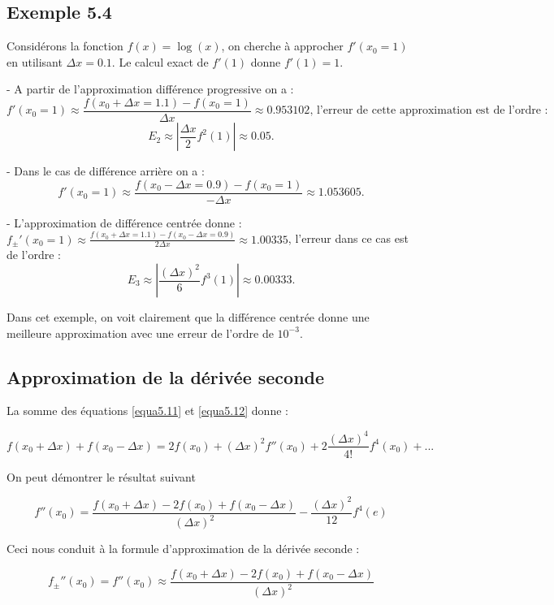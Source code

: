 \subsection{Exemple 5.4}
Considérons la fonction \( f(x) = \log(x) \), on cherche à approcher \( f'(x_0 = 1) \) en utilisant \( \Delta x = 0.1 \). Le calcul exact de \( f'(1) \) donne \( f'(1) = 1 \).

- A partir de l'approximation différence progressive on a :
\[
f'(x_0 = 1) \approx \frac{f(x_0 + \Delta x = 1.1) - f(x_0 = 1)}{\Delta x} \approx 0.953102, \, \text{l'erreur de cette approximation est de l'ordre : }
\]
\[
E_2 \approx \left| \frac{\Delta x}{2} f^2(1) \right| \approx 0.05.
\]

- Dans le cas de différence arrière on a :
\[
f'(x_0 = 1) \approx \frac{f(x_0 - \Delta x = 0.9) - f(x_0 = 1)}{-\Delta x} \approx 1.053605.
\]

- L'approximation de différence centrée donne : \( f_{\pm}'(x_0 = 1) \approx \frac{f(x_0 + \Delta x = 1.1) - f(x_0 - \Delta x = 0.9)}{2\Delta x} \approx 1.00335 \),  
l'erreur dans ce cas est de l'ordre :  
\[
E_3 \approx \left| \frac{(\Delta x)^2}{6} f^3(1) \right| \approx 0.00333.
\]

Dans cet exemple, on voit clairement que la différence centrée donne une meilleure approximation avec une erreur de l'ordre de \( 10^{-3} \).

\subsection{Approximation de la dérivée seconde}
La somme des équations \eqref{equa5.11} et \eqref{equa5.12} donne :

\begin{equation}\label{equa5.16}
f(x_0 + \Delta x) + f(x_0 - \Delta x) = 2f(x_0) + (\Delta x)^2 f''(x_0) + 2\frac{(\Delta x)^4}{4!} f^4(x_0) + ... 
\end{equation}

On peut démontrer le résultat suivant

\begin{equation}\label{equa5.17}
f''(x_0) = \frac{f(x_0 + \Delta x) - 2f(x_0) + f(x_0 - \Delta x)}{(\Delta x)^2} - \frac{(\Delta x)^2}{12} f^4(e) 
\end{equation}

Ceci nous conduit à la formule d'approximation de la dérivée seconde :

\begin{equation}\label{equa5.18}
f_{\pm}''(x_0) = f''(x_0) \approx \frac{f(x_0 + \Delta x) - 2f(x_0) + f(x_0 - \Delta x)}{(\Delta x)^2} 
\end{equation}

